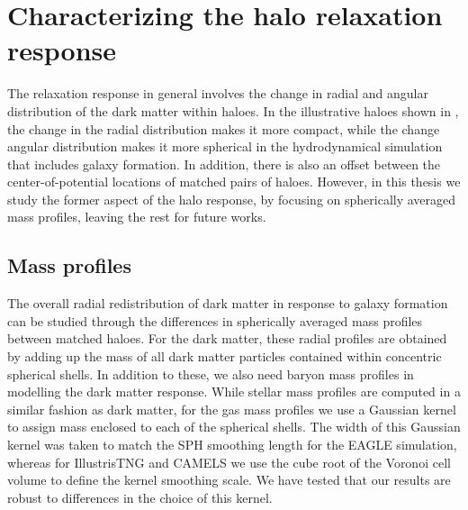 \section{Characterizing the halo relaxation response}
\label{sec:char_relxn_reln-ch:sims}
The relaxation response in general involves the change in radial and angular distribution of the dark matter within haloes. 
In the illustrative haloes shown in , the change in the radial distribution makes it more compact, while the change angular distribution makes it more spherical in the hydrodynamical simulation that includes galaxy formation. In addition, there is also an offset between the center-of-potential locations of matched pairs of haloes. However, in this thesis we study the former aspect of the halo response, by focusing on spherically averaged mass profiles, leaving the rest for future works.

\subsection{Mass profiles}
\label{subsec:massprofiles-ch:sims}

The overall radial redistribution of dark matter in response to galaxy formation can be studied through the differences in spherically averaged mass profiles between matched haloes. For the dark matter, these radial profiles are obtained by adding up the mass of all dark matter particles contained within concentric spherical shells. In addition to these, we also need baryon mass profiles in modelling the dark matter response. While stellar mass profiles are computed in a similar fashion as dark matter, for the gas mass profiles we use a Gaussian kernel to assign mass enclosed to each of the spherical shells. The width of this Gaussian kernel was taken to match the SPH smoothing length for the EAGLE simulation, whereas for IllustrisTNG and CAMELS we use the cube root of the Voronoi cell volume to define the kernel smoothing scale. We have tested that our results are robust to differences in the choice of this kernel.


